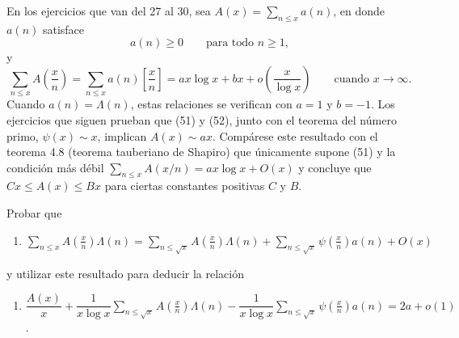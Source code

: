 \documentclass[12pt,a4paper]{book}
\begin{document}
    En los ejercicios que van del 27 al 30, sea $A(x)=\sum_{n\leq x}a(n)$, en donde
    $a(n)$ satisface
    \begin{equation}
        a(n)\geq0\qquad\text{para todo } n\geq1,
    \end{equation}
    y
    \begin{equation}
        \sum_{n\leq x}A\left(\frac{x}{n}\right)=\sum_{n\leq x}a(n)\left[\frac{x}{n}\right]
        =ax\log x+bx+o\left(\frac{x}{\log x}\right)\qquad\text{cuando } x\to\infty.
    \end{equation}
    Cuando $a(n)=\Lambda(n)$, estas relaciones se verifican con $a=1$ y $b=-1$. Los
    ejercicios que siguen prueban que (51) y (52), junto con el teorema del número
    primo, $\psi(x)\sim x$, implican $A(x)\sim ax$. Compárese este resultado con el
    teorema 4.8 (teorema tauberiano de Shapiro) que únicamente supone (51) y la
    condición más débil $\sum_{n\leq x}A(x/n)=ax\log x+O(x)$ y concluye que
    $Cx\leq A(x)\leq Bx$ para ciertas constantes positivas $C$ y $B$.

    \begin{ejercicio}
        Probar que
        \begin{enumerate}
            \item[(a)] $\displaystyle\sum_{n\leq x}A\left(\frac{x}{n}\right)\Lambda(n)
            =\sum_{n\leq\sqrt{x}}A\left(\frac{x}{n}\right)\Lambda(n)
            +\sum_{n\leq\sqrt{x}}\psi\left(\frac{x}{n}\right)a(n)+O(x)$
        \end{enumerate}
        y utilizar este resultado para deducir la relación
        \begin{enumerate}
            \item[(b)] $\dfrac{A(x)}{x}+\dfrac{1}{x\log x}\displaystyle\sum_{n\leq\sqrt{x}}
            A\left(\frac{x}{n}\right)\Lambda(n)-\dfrac{1}{x\log x}\sum_{n\leq\sqrt{x}}
            \psi\left(\frac{x}{n}\right)a(n)=2a+o(1)$.
        \end{enumerate}
    \end{ejercicio}
\end{document}
